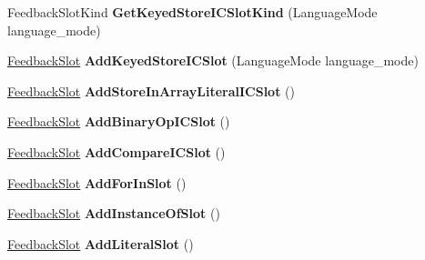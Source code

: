 \begin{DoxyCompactItemize}
Feedback\+Slot\+Kind {\bfseries Get\+Keyed\+Store\+I\+C\+Slot\+Kind} (Language\+Mode language\+\_\+mode)
\item 
\mbox{\label{classv8_1_1internal_1_1FeedbackVectorSpec_a5d8f7ca4f2150578701ad13f35a41561}} 
\mbox{\hyperlink{classv8_1_1internal_1_1FeedbackSlot}{Feedback\+Slot}} {\bfseries Add\+Keyed\+Store\+I\+C\+Slot} (Language\+Mode language\+\_\+mode)
\item 
\mbox{\label{classv8_1_1internal_1_1FeedbackVectorSpec_a1b46742a132c4b011602b83ad8e7d2b6}} 
\mbox{\hyperlink{classv8_1_1internal_1_1FeedbackSlot}{Feedback\+Slot}} {\bfseries Add\+Store\+In\+Array\+Literal\+I\+C\+Slot} ()
\item 
\mbox{\label{classv8_1_1internal_1_1FeedbackVectorSpec_ab9ec42de29bc1d5dbbb1fa24ca954f59}} 
\mbox{\hyperlink{classv8_1_1internal_1_1FeedbackSlot}{Feedback\+Slot}} {\bfseries Add\+Binary\+Op\+I\+C\+Slot} ()
\item 
\mbox{\label{classv8_1_1internal_1_1FeedbackVectorSpec_a6db5e567763b5ea69e9b6a7c117d6ecb}} 
\mbox{\hyperlink{classv8_1_1internal_1_1FeedbackSlot}{Feedback\+Slot}} {\bfseries Add\+Compare\+I\+C\+Slot} ()
\item 
\mbox{\label{classv8_1_1internal_1_1FeedbackVectorSpec_a3a97b6f206df8ee103ccc7267b3faf39}} 
\mbox{\hyperlink{classv8_1_1internal_1_1FeedbackSlot}{Feedback\+Slot}} {\bfseries Add\+For\+In\+Slot} ()
\item 
\mbox{\label{classv8_1_1internal_1_1FeedbackVectorSpec_a3f6c1d1d9ab93e9821a6d0fb35c91c20}} 
\mbox{\hyperlink{classv8_1_1internal_1_1FeedbackSlot}{Feedback\+Slot}} {\bfseries Add\+Instance\+Of\+Slot} ()
\item 
\mbox{\label{classv8_1_1internal_1_1FeedbackVectorSpec_a886fded8d478666c5a7e0e1c877bb45e}} 
\mbox{\hyperlink{classv8_1_1internal_1_1FeedbackSlot}{Feedback\+Slot}} {\bfseries Add\+Literal\+Slot} ()
\item 
\mbox{\label{classv8_1_1internal_1_1FeedbackVectorSpec_a263873cd9e7154e2ff11cf735d84228f}} 

\end{DoxyCompactItemize}
